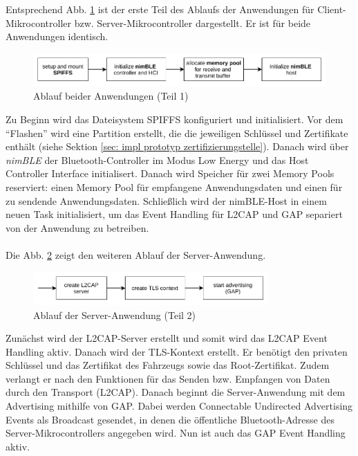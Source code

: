 Entsprechend Abb. \ref{fig: impl ablauf anwendung teil 1} ist der erste Teil des Ablaufs der Anwendungen für Client-Mikrocontroller bzw. Server-Mikrocontroller dargestellt. Er ist für beide Anwendungen identisch.
\begin{figure}[H]
    \centering
    \includegraphics[width=1\textwidth]{graphics/ablauf_anwendung_teil_1.pdf}
    \caption[Ablauf beider Anwendungen (Teil 1)]{Ablauf beider Anwendungen (Teil 1)}
    \label{fig: impl ablauf anwendung teil 1}
\end{figure}
Zu Beginn wird das Dateisystem SPIFFS konfiguriert und initialisiert. Vor dem "`Flashen"' wird eine Partition erstellt, die die jeweiligen Schlüssel und Zertifikate enthält (siehe Sektion \ref{sec: impl prototyp zertifizierungstelle}). Danach wird über \textit{nimBLE} der Bluetooth-Controller im Modus Low Energy und das Host Controller Interface initialisert. Danach wird Speicher für zwei Memory Pools reserviert: einen Memory Pool für empfangene Anwendungsdaten und einen für zu sendende Anwendungsdaten. Schließlich wird der nimBLE-Host in einem neuen Task initialisiert, um das Event Handling für L2CAP und GAP separiert von der Anwendung zu betreiben.
\\\\
Die Abb. \ref{fig: impl ablauf anwendung server teil 2} zeigt den weiteren Ablauf der Server-Anwendung.
\begin{figure}[H]
    \centering
    \includegraphics[width=0.8\textwidth]{graphics/ablauf_anwendung_teil_2_server.pdf}
    \caption[Ablauf der Server-Anwendung (Teil 2)]{Ablauf der Server-Anwendung (Teil 2)}
    \label{fig: impl ablauf anwendung server teil 2}
\end{figure}
Zunächst wird der L2CAP-Server erstellt und somit wird das L2CAP Event Handling aktiv. Danach wird der TLS-Kontext erstellt. Er benötigt den privaten Schlüssel und das Zertifikat des Fahrzeugs sowie das Root-Zertifikat. Zudem verlangt er nach den Funktionen für das Senden bzw. Empfangen von Daten durch den Transport (L2CAP). Danach beginnt die Server-Anwendung mit dem Advertising mithilfe von GAP. Dabei werden Connectable Undirected Advertising Events als Broadcast gesendet, in denen die öffentliche Bluetooth-Adresse des Server-Mikrocontrollers angegeben wird. Nun ist auch das GAP Event Handling aktiv.
